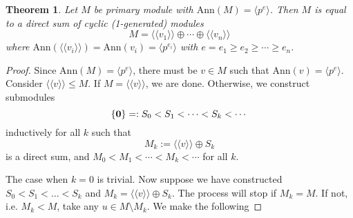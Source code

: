 \documentclass[11pt,openany]{book}
\theoremstyle{plain}
\newtheorem{theorem}{Theorem}[chapter]
\theoremstyle{definition}
\theoremstyle{remark}
\begin{document}
\begin{theorem}\label{thm-decom}
    Let $M$ be primary module with $\mathrm{Ann}(M)=\langle p^e\rangle$. Then $M$ is equal to a direct sum of cyclic (1-generated) modules
    $$M=\langle\langle v_1\rangle\rangle\oplus\cdots\oplus\langle\langle v_n\rangle\rangle$$
    where $\mathrm{Ann}(\langle\langle v_i\rangle\rangle)=\mathrm{Ann}(v_i)= \langle p^{e_i} \rangle$ with $e=e_1\geq e_2\geq\cdots\geq e_n$.
\end{theorem}

\begin{proof}
    Since $\mathrm{Ann}(M)=\langle p^e\rangle$, there must be $v\in M$ such that $\mathrm{Ann}(v)=\langle p^e\rangle$.\\
    Consider $\langle\langle v\rangle\rangle\leq M$.  If $M=\langle\langle v\rangle\rangle$, we are done. Otherwise, we construct submodules $$\{{\bf 0}\}=: S_0< S_1< \cdots < S_k < \cdots$$ 
    inductively for all $k$ such that
    $$M_k :=\langle\langle v\rangle\rangle\oplus S_k$$
    is a direct sum, and $M_0<M_1< \cdots < M_k < \cdots$ for all $k$.
    \medskip
    
    The case when $k = 0$ is trivial. Now suppose we have constructed $S_0 < S_1 < \dots < S_k$ and
    $M_k = \langle \langle v \rangle \rangle \oplus S_k$. The process will stop if $M_k = M$. If not, i.e. $M_k<M$, take any $u\in M\setminus M_k$. We make the following 

    \bigskip
    \noindent {}
\bigskip


\end{proof}
\end{document}
